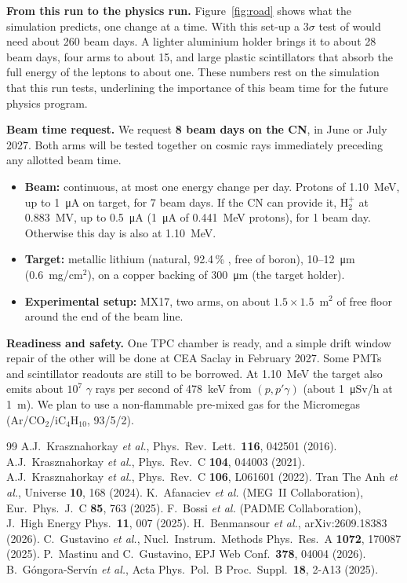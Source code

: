 \textbf{From this run to the physics run.} Figure~\ref{fig:road} shows what the simulation predicts, one change at a
time. With this set-up a $3\sigma$ test of \Ratk{} would need about 260 beam days. A lighter aluminium holder brings it to
about 28 beam days, four arms to about 15, and large plastic scintillators that absorb the full energy of the leptons to
about one. These numbers rest on the simulation that this run tests, underlining the importance of this beam time for the future physics program.

\textbf{Beam time request.} We request \textbf{8 beam days on the CN}, in June or July 2027.
Both arms will be tested together on cosmic rays immediately preceding any allotted beam time.
\begin{itemize}
\item \textbf{Beam:} continuous, at most one energy change per day. Protons of 1.10~MeV, up to 1~\si{\micro\ampere} on
target, for 7 beam days. If the CN can provide it, H$_2^+$ at 0.883~MV, up to 0.5~\si{\micro\ampere}
(1~\si{\micro\ampere} of 0.441~MeV protons), for 1 beam day. Otherwise this day is also at 1.10~MeV.
\item \textbf{Target:} metallic lithium (natural, 92.4\,\% \Li{}, free of boron), 10--12~\si{\micro\metre}
(0.6~mg/cm$^2$), on a copper backing of 300~\si{\micro\metre} (the target holder).
\item \textbf{Experimental setup:} MX17, two arms, on about $1.5\times1.5$~m$^2$ of free floor around the end of the
beam line. 
\end{itemize}

\textbf{Readiness and safety.} One TPC chamber is ready, and a simple drift window repair of the other will be done at CEA Saclay in February 2027. Some PMTs and scintillator readouts are still to be borrowed. At 1.10~MeV the target also emits about $10^7$ $\gamma$ rays per second of 478~keV from \Li$(p,p'\gamma)$ (about 1~\si{\micro\sievert}/h at 1~m). We plan to use a non-flammable pre-mixed gas for the Micromegas (Ar/CO$_2$/iC$_4$H$_{10}$, 93/5/2).

\begin{thebibliography}{99}
 A.J.~Krasznahorkay \emph{et al.}, Phys.\ Rev.\ Lett.\ \textbf{116}, 042501 (2016).
 A.J.~Krasznahorkay \emph{et al.}, Phys.\ Rev.\ C \textbf{104}, 044003 (2021).
 A.J.~Krasznahorkay \emph{et al.}, Phys.\ Rev.\ C \textbf{106}, L061601 (2022).
 Tran The Anh \emph{et al.}, Universe \textbf{10}, 168 (2024).
 K.~Afanaciev \emph{et al.} (MEG~II Collaboration), Eur.\ Phys.\ J.\ C \textbf{85}, 763 (2025).
 F.~Bossi \emph{et al.} (PADME Collaboration), J.\ High Energy Phys.\ \textbf{11}, 007 (2025).
 H.~Benmansour \emph{et al.}, arXiv:2609.18383 (2026).
 C.~Gustavino \emph{et al.}, Nucl.\ Instrum.\ Methods Phys.\ Res.\ A \textbf{1072}, 170087 (2025).
 P.~Mastinu and C.~Gustavino, EPJ Web Conf.\ \textbf{378}, 04004 (2026).
 B.~G\'ongora-Serv\'in \emph{et al.}, Acta Phys.\ Pol.\ B Proc.\ Suppl.\ \textbf{18}, 2-A13 (2025).
\end{thebibliography}
